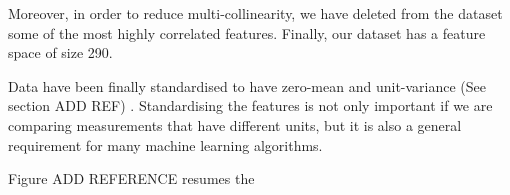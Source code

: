 Moreover, in order to reduce multi-collinearity, we have deleted from the dataset some of the most highly correlated features. Finally, our dataset has a feature space of size 290. 



Data have been finally standardised to have zero-mean and unit-variance (See section ADD REF) . Standardising the features is not only important if we are comparing measurements that have different units, but it is also a general requirement for many machine learning algorithms.

Figure ADD REFERENCE resumes the  






